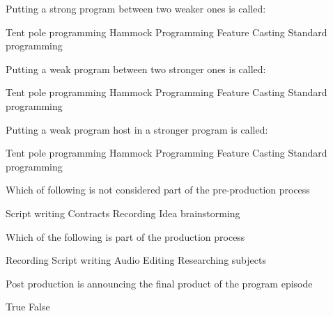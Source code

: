 \documentclass[theme=sleek, randomorder, hidesidemenu]{webquiz}
\begin{document}
\begin{question}
  Putting a strong program between two weaker ones is called:
  \begin{choice}
    \correct Tent pole programming
    \incorrect Hammock Programming
    \incorrect Feature Casting
    \incorrect Standard programming
  \end{choice}
\end{question}

\begin{question}
  Putting a weak program between two stronger ones is called:
  \begin{choice}
    \incorrect Tent pole programming
    \correct Hammock Programming
    \incorrect Feature Casting
    \incorrect Standard programming
  \end{choice}
\end{question}

\begin{question}
  Putting a weak program host in a stronger program is called:
  \begin{choice}
    \incorrect Tent pole programming
    \incorrect Hammock Programming
    \correct Feature Casting
    \incorrect Standard programming
  \end{choice}
\end{question}

\begin{question}
  Which of following is not considered part of the pre-production process
  \begin{choice}
    \incorrect Script writing
    \incorrect Contracts
    \correct Recording
    \incorrect Idea brainstorming
  \end{choice}
\end{question}

\begin{question}
  Which of the following is part of the production process
  \begin{choice}[multiple]
    \correct Recording
    \incorrect Script writing
    \correct Audio Editing
    \incorrect Researching subjects
  \end{choice}
\end{question}

\begin{question}
  Post production is announcing the final product of the program episode
  \begin{choice}
    \correct True
    \incorrect False
  \end{choice}
\end{question}
\end{document}
